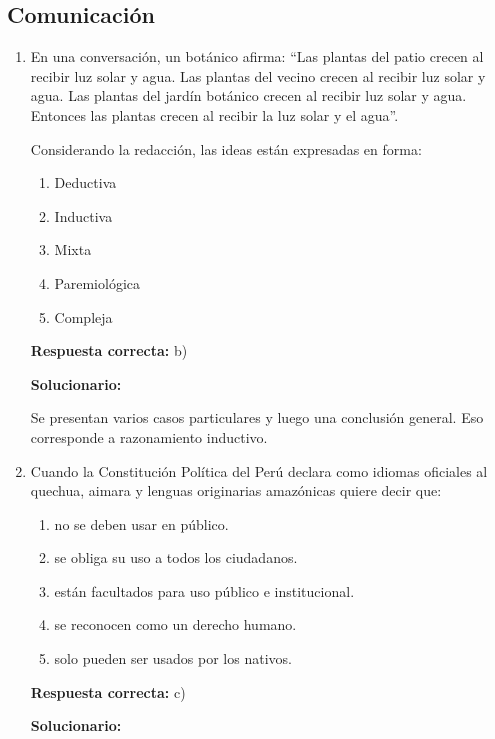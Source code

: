 \subsection*{Comunicación}

\begin{enumerate}[resume]
	
	\item En una conversación, un botánico afirma: “Las plantas del patio crecen al recibir luz solar y agua. Las plantas del vecino crecen al recibir luz solar y agua. Las plantas del jardín botánico crecen al recibir luz solar y agua. Entonces las plantas crecen al recibir la luz solar y el agua”.
	
	Considerando la redacción, las ideas están expresadas en forma:
	\begin{enumerate}[label=\alph*)]
		\item Deductiva
		\item Inductiva
		\item Mixta
		\item Paremiológica
		\item Compleja
	\end{enumerate}
	\textbf{Respuesta correcta:} b)
	
	\vspace{2mm}
	\textbf{Solucionario:}
	
	Se presentan varios casos particulares y luego una conclusión general. Eso corresponde a razonamiento inductivo.
	
	\vspace{6mm}
	
	\item Cuando la Constitución Política del Perú declara como idiomas oficiales al quechua, aimara y lenguas originarias amazónicas quiere decir que:
	\begin{enumerate}[label=\alph*)]
		\item no se deben usar en público.
		\item se obliga su uso a todos los ciudadanos.
		\item están facultados para uso público e institucional.
		\item se reconocen como un derecho humano.
		\item solo pueden ser usados por los nativos.
	\end{enumerate}
	\textbf{Respuesta correcta:} c)
	
	\vspace{2mm}
	\textbf{Solucionario:}
	

\end{enumerate}
